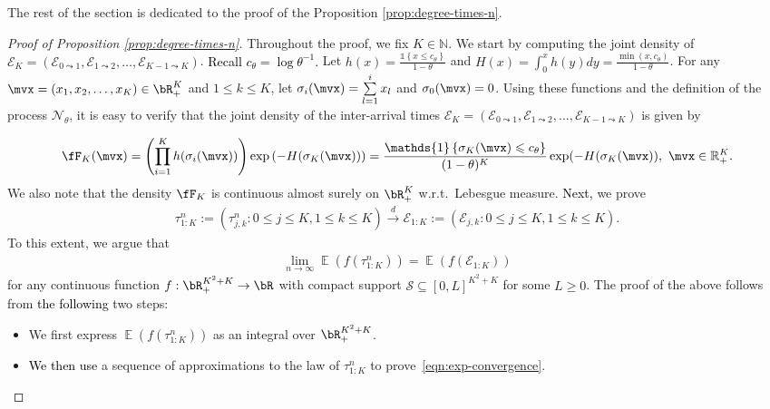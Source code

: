 \documentclass[letterpaper,11pt,reqno]{amsart}
\theoremstyle{definition}
\renewcommand{\le}{\leqslant}
\renewcommand{\leq}{\leqslant}
\renewcommand{\geq}{\geqslant}
\newcommand{\ind}{\mathds{1}}
\newcommand{\set}[1]{\left\{#1\right\}}
\newcommand{\cS}{\mathcal{S}}\newcommand{\cT}{\mathcal{T}}\newcommand{\cU}{\mathcal{U}}
\newcommand{\bb}[1]{\mathbb{#1}}
\newcommand{\sE}{\mathscr{E}}
\DeclareMathOperator{\E}{\mathds{E}}
\newcommand{\convd}{\stackrel{d}{\longrightarrow}}
\begin{document}
The rest of the section is dedicated to the proof of the Proposition \ref{prop:degree-times-n}. 
\begin{proof}[Proof of Proposition \ref{prop:degree-times-n}]
     Throughout the proof, we fix $K \in \mathbb{N}$. We start by computing the joint density of $\sE_{K}= (\sE_{0\leadsto 1},\sE_{1 \leadsto 2},\dots,\sE_{K-1\leadsto K})$. \textcolor{black}{Recall $c_{\theta}=\log \theta^{-1}$.} Let $h(x) = \frac{\ind\set{x \leq c_\theta}}{1-\theta}$ and $H(x) = \int_0^x h(y)dy = \frac{\min(x,c_\theta)}{1-\theta}$. For any $\mvx = (x_1,x_2,\dots,x_K)\in \bR^K_+$ and $1 \le k \le K$, let $\sigma_i(\mvx) = \sum\limits_{l=1}^i x_l$ and $\sigma_0(\mvx) = 0$.
Using these functions and the definition of the process $\mathcal{N}_{\theta}$, it is easy to verify that the joint density of the inter-arrival times $\sE_{K}= (\sE_{0\leadsto 1},\sE_{1 \leadsto 2},\dots,\sE_{K-1\leadsto K})$ is given by 

\textcolor{black}{
\begin{align}\label{eqn:joint-density}
    \fF_K(\mvx) =  \left(\prod\limits_{i=1}^K h(\sigma_i(\mvx)) \right)\exp\left(-H(\sigma_K(\mvx))\right) = \frac{\ind\set{\sigma_{K}(\mvx) \leq c_{\theta}}}{(1-\theta)^K} \exp(-H(\sigma_K(\mvx)) , \ \mvx \in \bb{R}_+^K.
\end{align}}
We also note that the density $\fF_K$ is continuous almost surely on $\bR_+^K$ w.r.t.~Lebesgue measure. \textcolor{black}{Next,} we prove \begin{align*}
        \tau^n_{1:K} := \left(\tau^n_{j,k}:0\leq j\leq K, 1 \leq k\leq K\right) \convd \sE_{1:K} := \left(\sE_{j,k}:0\leq j\leq K, 1 \leq k\leq K\right). 
    \end{align*} To this extent, we argue that \begin{align}\label{eqn:exp-convergence}
        \lim\limits_{n\to \infty}\E\left(f(\tau^n_{1:K})\right) = \E\left(f(\sE_{1:K})\right)
    \end{align} for any continuous function $f:\bR_+^{K^2+K}\to \bR$ with compact support $\cS \subseteq [0,L]^{K^2+K}$ for some $L \geq 0$. The proof of the above follows from \textcolor{black}{ the following} two steps:
    \begin{itemize}
        \item[(i)] We first express $\E\left(f(\tau^n_{1:K})\right)$ as an integral over $\bR_+^{K^2+K}$.
        \item[(ii)] \textcolor{black}{We then use} a sequence of approximations to the law of $\tau^n_{1:K}$ to prove~\eqref{eqn:exp-convergence}.
    \end{itemize}
    

\end{proof}
\end{document}
